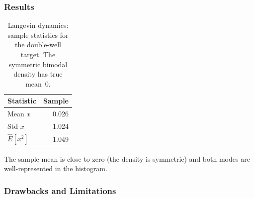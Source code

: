 \documentclass[12pt, a4paper]{article}
\begin{document}
\subsubsection{Results}

\begin{table}[H]
    \centering
    \begin{tabular}{lr}
        \toprule
        \textbf{Statistic}
            & \textbf{Sample} \\
        \midrule
        Mean $x$
            & 0.026 \\
        Std $x$
            & 1.024 \\
        $\hat{E}[x^2]$
            & 1.049 \\
        \bottomrule
    \end{tabular}
    \caption{Langevin dynamics: sample statistics for the
             double-well target.  The symmetric bimodal
             density has true mean~0.}
    \label{tab:langevin_results}
\end{table}

The sample mean is close to zero (the density is symmetric)
and both modes are well-represented in the histogram.

\subsubsection{Drawbacks and Limitations}
\end{document}
